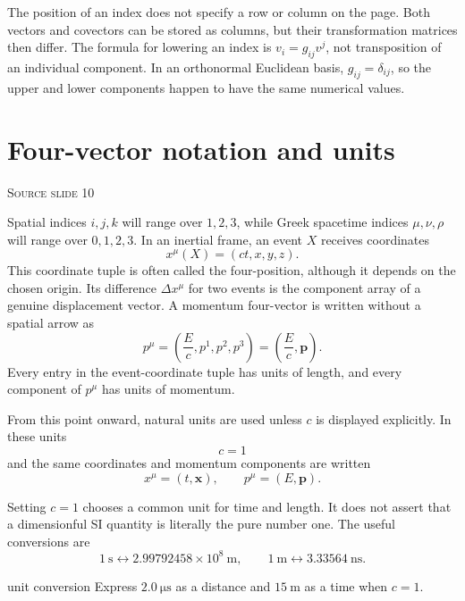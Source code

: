 \documentclass[11pt,a4paper]{article}
\newcommand{\vect}[1]{\bm{#1}}
\newcommand{\slideref}[1]{%
  \par\smallskip
  {\footnotesize\color{ink!60}\textsc{Source slide #1}}\par
}
\begin{document}
\begin{precision}
The position of an index does not specify a row or column on the page. Both
vectors and covectors can be stored as columns, but their transformation
matrices then differ. The formula for lowering an index is
\(v_i=g_{ij}v^j\), not transposition of an individual component. In an
orthonormal Euclidean basis, \(g_{ij}=\delta_{ij}\), so the upper and lower
components happen to have the same numerical values.
\end{precision}

\section{Four-vector notation and units}
\slideref{10}

Spatial indices \(i,j,k\) will range over \(1,2,3\), while Greek spacetime
indices \(\mu,\nu,\rho\) will range over \(0,1,2,3\). In an inertial frame, an
event \(X\) receives coordinates
\[
  x^\mu(X)=(ct,x,y,z).
\]
This coordinate tuple is often called the four-position, although it depends
on the chosen origin. Its difference \(\Delta x^\mu\) for two events is the
component array of a genuine displacement vector. A momentum four-vector is
written without a spatial arrow as
\[
  p^\mu=\left(\frac{E}{c},p^1,p^2,p^3\right)
  =\left(\frac{E}{c},\vect p\right).
\]
Every entry in the event-coordinate tuple has units of length, and every
component of \(p^\mu\) has units of momentum.

\begin{samepage}
From this point onward, natural units are used unless \(c\) is displayed
explicitly. In these units
\[
  c=1
\]
and the same coordinates and momentum components are written
\[
  x^\mu=(t,\vect{x}),
  \qquad
  p^\mu=(E,\vect{p}).
\]
\end{samepage}

\begin{precision}[What \(c=1\) means]
Setting \(c=1\) chooses a common unit for time and length. It does not assert
that a dimensionful SI quantity is literally the pure number one. The useful
conversions are
\[
  1~\mathrm{s}\longleftrightarrow
  2.99792458\times10^8~\mathrm{m},
  \qquad
  1~\mathrm{m}\longleftrightarrow
  3.33564~\mathrm{ns}.
\]
\end{precision}

\begin{studentwork}[height=4.8cm]{unit conversion}
Express \(2.0~\mathrm{\mu s}\) as a distance and \(15~\mathrm{m}\) as a time
when \(c=1\).
\end{studentwork}
\end{document}
